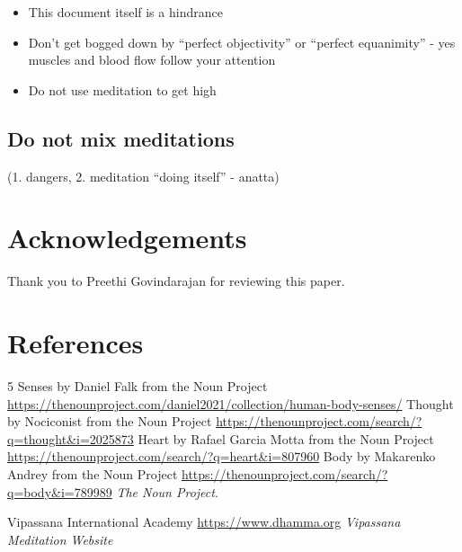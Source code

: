 \documentclass[a4paper, amsfonts, amssymb, amsmath, reprint, showkeys, nofootinbib, twoside]{revtex4-1}
\begin{document}
\begin{itemize}
  \item This document itself is a hindrance
  \item Don't get bogged down by ``perfect objectivity'' or ``perfect equanimity'' - yes muscles and blood flow follow your attention
  \item Do not use meditation to get high
\end{itemize}

\subsection{Do not mix meditations}

(1. dangers, 2. meditation ``doing itself'' - anatta)


\section*{Acknowledgements}

Thank you to Preethi Govindarajan for reviewing this paper.


\section*{References}

\begin{thebibliography}{99}

  5 Senses by Daniel Falk from the Noun Project
  \url{https://thenounproject.com/daniel2021/collection/human-body-senses/}
  Thought by Nociconist from the Noun Project
  \url{https://thenounproject.com/search/?q=thought&i=2025873}
  Heart by Rafael Garcia Motta from the Noun Project
  \url{https://thenounproject.com/search/?q=heart&i=807960}
  Body by Makarenko Andrey from the Noun Project
  \url{https://thenounproject.com/search/?q=body&i=789989}
  \textit{The Noun Project}.

  Vipassana International Academy
  \url{https://www.dhamma.org}
  \textit{Vipassana Meditation Website}


\end{thebibliography}
\end{document}
